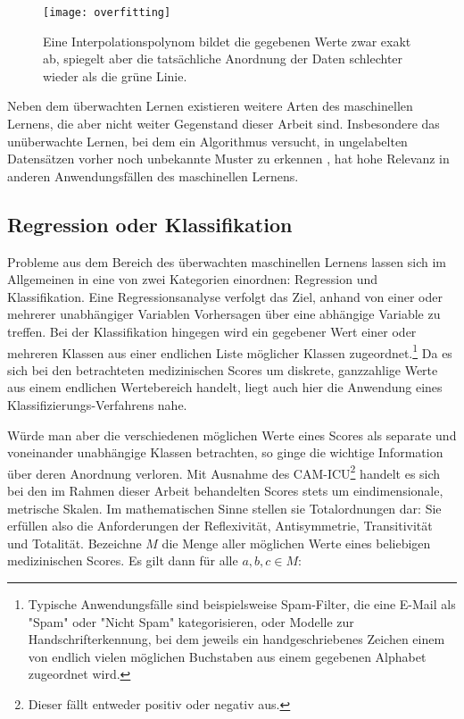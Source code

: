 \begin{figure}[htb]
    \centering
    \texttt{[image: overfitting]}
    \caption{Eine Interpolationspolynom bildet die gegebenen Werte zwar exakt ab, spiegelt aber die tatsächliche Anordnung der Daten schlechter wieder als die grüne Linie.}
    \label{fig:overfitting}
\end{figure} %

Neben dem überwachten Lernen existieren weitere Arten des maschinellen Lernens, die aber nicht weiter Gegenstand dieser Arbeit sind. Insbesondere das unüberwachte Lernen, bei dem ein Algorithmus versucht, in ungelabelten Datensätzen vorher noch unbekannte Muster zu erkennen \citep{russellArtificialIntelligenceModern2020}, hat hohe Relevanz in anderen Anwendungsfällen des maschinellen Lernens.

\subsection{Regression oder Klassifikation}\label{section:regrvsclf}
Probleme aus dem Bereich des überwachten maschinellen Lernens lassen sich im Allgemeinen in eine von zwei Kategorien einordnen: Regression und Klassifikation. Eine Regressionsanalyse verfolgt das Ziel, anhand von einer oder mehrerer unabhängiger Variablen Vorhersagen über eine abhängige Variable zu treffen. Bei der Klassifikation hingegen wird ein gegebener Wert einer oder mehreren Klassen aus einer endlichen Liste möglicher Klassen zugeordnet.\footnote{Typische Anwendungsfälle sind beispielsweise Spam-Filter, die eine E-Mail als "Spam" oder "Nicht Spam" kategorisieren, oder Modelle zur Handschrifterkennung, bei dem jeweils ein handgeschriebenes Zeichen einem von endlich vielen möglichen Buchstaben aus einem gegebenen Alphabet zugeordnet wird.}
Da es sich bei den betrachteten medizinischen Scores um diskrete, ganzzahlige Werte aus einem endlichen Wertebereich handelt, liegt auch hier die Anwendung eines Klassifizierungs-Verfahrens nahe.

Würde man aber die verschiedenen möglichen Werte eines Scores als separate und voneinander unabhängige Klassen betrachten, so ginge die wichtige Information über deren Anordnung verloren. Mit Ausnahme des CAM-ICU\footnote{Dieser fällt entweder positiv oder negativ aus.} handelt es sich bei den im Rahmen dieser Arbeit behandelten Scores stets um eindimensionale, metrische Skalen. Im mathematischen Sinne stellen sie Totalordnungen dar: Sie erfüllen also die Anforderungen der Reflexivität, Antisymmetrie, Transitivität und Totalität. Bezeichne $M$ die Menge aller möglichen Werte eines beliebigen medizinischen Scores. Es gilt dann für alle $a,b,c \in M$:

